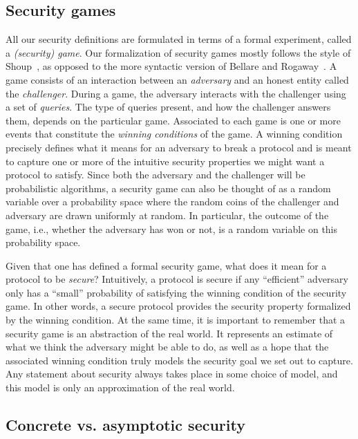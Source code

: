 \subsection{Security games}

All our security definitions are formulated in terms of a formal experiment, called  a \emph{(security) game}.
Our formalization of security games mostly follows the style of Shoup~\cite{EPRINT:Shoup04},
as opposed to the more syntactic version of Bellare and Rogaway~\cite{EPRINT:BelRog04}.
A game consists of an interaction between an \emph{adversary} and an honest entity called the \emph{challenger}.
During a game,
the adversary interacts with the challenger using a set of \emph{queries}.
The type of queries present,
and how the challenger answers them,
depends on the particular game.
Associated to each game is one or more events that constitute the \emph{winning conditions} of the game. 
A winning condition precisely defines what it means for an adversary to break a protocol and is meant to capture one or more of the intuitive security properties we might want a protocol to satisfy.
Since both the adversary and the challenger will be probabilistic algorithms,
a security game can also be thought of as a random variable over a probability space where the random coins of the challenger and adversary are drawn uniformly at random.
In particular,
the outcome of the game,
i.e., whether the adversary has won or not,
is a random variable on this probability space.


Given that one has defined a formal security game,
what does it mean for a protocol to be \emph{secure}? 
Intuitively,
a protocol is secure if any ``efficient'' adversary only has a ``small'' probability of satisfying the winning condition of the security game.
In other words,
a secure protocol provides the security property formalized by the winning condition.
At the same time,
it is important to remember that a security game is an abstraction of the real world.
It represents an estimate of what we think the adversary might be able to do,
as well as a hope that the associated winning condition truly models the security goal we set out to capture.
Any statement about security always takes place in some choice of model,
and this model is only an approximation of the real world.



\subsection{Concrete vs. asymptotic security}

